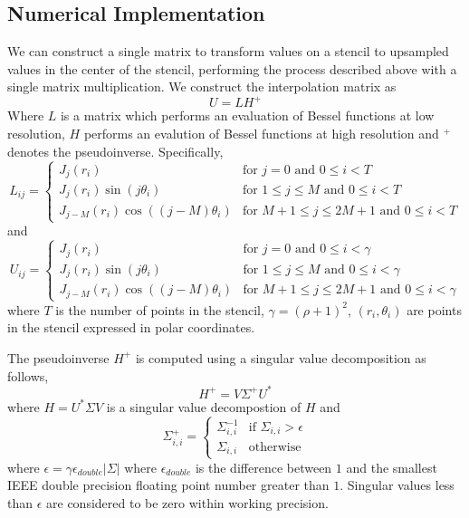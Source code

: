 \documentclass{report}
\begin{document}
\subsection{Numerical Implementation}
We can construct a single matrix to transform values on a stencil to upsampled values in the center of the stencil, performing the process described above with a single matrix multiplication. We construct the interpolation matrix as
\[
U = L H^{+}
\]
Where $L$ is a matrix which performs an evaluation of Bessel functions at low resolution, $H$ performs an evalution of Bessel functions at high resolution and $^{+}$ denotes the pseudoinverse. Specifically,
\[
L_{ij} =\begin{cases}
J_{j}(r_{i}) & \text{for } j = 0 \text{ and } 0 \le i < T\\
J_{j}(r_{i}) \sin{(j \theta_{i})} & \text{for } 1 \le j \le M \text{ and } 0 \le i < T\\
J_{j-M}(r_{i}) \cos{((j-M) \theta_{i})} & \text{for } M+1 \le j \le 2M+1 \text{ and } 0 \le i < T
\end{cases}
\]
and
\[
U_{ij} =\begin{cases}
J_{j}(r_{i}) & \text{for } j = 0 \text{ and } 0 \le i < \gamma\\
J_{j}(r_{i}) \sin{(j \theta_{i})} & \text{for } 1 \le j \le M \text{ and } 0 \le i < \gamma\\
J_{j-M}(r_{i}) \cos{((j-M) \theta_{i})} & \text{for } M+1 \le j \le 2M+1 \text{ and } 0 \le i < \gamma
\end{cases}
\]
where $T$ is the number of points in the stencil, $\gamma = (\rho + 1)^{2}$, $(r_{i},\theta_{i})$ are points in the stencil expressed in polar coordinates.

The pseudoinverse $H^{+}$ is computed using a singular value decomposition as follows,
\[
H^{+} = V \Sigma^{+} U^{*}
\]
where $H = U^{*} \Sigma V$ is a singular value decompostion of $H$ and
\[
\Sigma^{+}_{i,i} =\begin{cases}
\Sigma_{i,i}^{-1} & \text{if }\Sigma_{i,i} > \epsilon\\
\Sigma_{i,i} & \text{otherwise}
\end{cases}
\]
where $\epsilon = \gamma \epsilon_{double} \vert \Sigma \vert$ where $\epsilon_{double}$ is the difference between $1$ and the smallest IEEE double precision floating point number greater than $1$. Singular values less than $\epsilon$ are considered to be zero within working precision.
\end{document}
